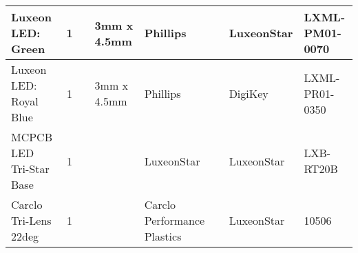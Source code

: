\documentclass[12pt,letterpaper,onecolumn,landscape]{article}
\begin{document}
\begin{tabular}{ | p{4cm} | c | l | l | p{4cm} | l | l | l |}
	Luxeon LED: Green & 
	1 & 
	& 
	3mm x 4.5mm & 
	Phillips & 
	& 
	LuxeonStar & 
	LXML-PM01-0070
	\\ \hline

	Luxeon LED: Royal Blue & 
	1 & 
	& 
	3mm x 4.5mm& 
	Phillips & 
	& 
	DigiKey & 
	LXML-PR01-0350
	\\ \hline

	MCPCB LED Tri-Star Base & 
	1 & 
	& 
	& 
	LuxeonStar & 
	& 
	LuxeonStar & 
	LXB-RT20B
	\\ \hline

	Carclo Tri-Lens 22deg & 
	1 & 
	& 
	& 
	Carclo Performance Plastics & 
	& 
	LuxeonStar & 
	10506
	\\ \hline


	\end{tabular}
\end{document}
